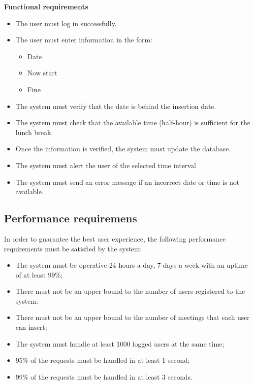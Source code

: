 \documentclass{article}
\begin{document}
	
	\bigskip
	\noindent
	\textbf{Functional requirements} \\
	\begin{itemize}
		\item The user must log in successfully.
		\item The user must enter information in the form:
			\begin{itemize}
				\item Date
				\item Now start
				\item Fine
			\end{itemize}
		\item The system must verify that the date is behind the insertion date.
		\item The system must check that the available time (half-hour) is sufficient for the lunch break.
		\item Once the information is verified, the system must update the database.
		\item The system must alert the user of the selected time interval
		\item The system must send an error message if an incorrect date or time is not available.
	\end{itemize}

	
	\subsection{Performance requiremens}
	In order to guarantee the best user experience, the following performance requirements must be satisfied by the system:
	\begin{itemize}
		\item The system must be operative 24 hours a day, 7 days a week with an uptime of at least 99\%;
		\item There must not be an upper bound to the number of users registered to the system;
		\item There must not be an upper bound to the number of meetings that each user can insert; 
		\item The system must handle at least 1000 logged users at the same time;
		\item 95\% of the requests must be handled in at least 1 second; \footnotemark[1]
		\item 99\%  of the requests must be handled in at least 3 seconds. \footnotemark[1]
	\end{itemize}
	
	\bigskip
	\noindent
	
\end{document}
